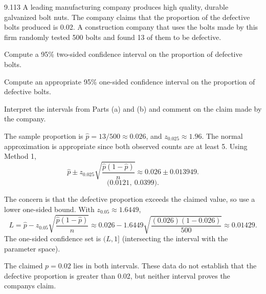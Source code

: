 \documentclass[11pt,oneside]{article}
\begin{document}
\begin{exercise}{9.113}
A leading manufacturing company produces high quality, durable galvanized bolt nuts. The company claims that the proportion of the defective bolts produced is 0.02. A construction company that uses the bolts made by this firm randomly tested 500 bolts and found 13 of them to be defective.
\begin{exercisesubparts}
\item Compute a 95\% two-sided confidence interval on the proportion of defective bolts.
\item Compute an appropriate 95\% one-sided confidence interval on the proportion of defective bolts.
\item Interpret the intervals from Parts (a) and (b) and comment on the claim made by the company.
\end{exercisesubparts}
\end{exercise}
\begin{solution}
\begin{exercisesubparts}
\item The sample proportion is $\hat p=13/500\approx0.026$, and $z_{0.025}\approx1.96$. The normal approximation is appropriate since both observed counts are at least 5. Using Method 1,
\[
\hat p\pm z_{0.025}\sqrt{\frac{\hat p(1-\hat p)}{n}}\approx0.026\pm 0.013949.
\]
\[
\boxed{\bigl(0.0121,\ 0.0399\bigr)}.
\]

\item The concern is that the defective proportion exceeds the claimed value, so use a lower one-sided bound. With $z_{0.05}\approx1.6449$,
\[
L=\hat p-z_{0.05}\sqrt{\frac{\hat p(1-\hat p)}{n}}\approx 0.026-1.6449\sqrt{\frac{(0.026)(1-0.026)}{500}}\approx\boxed{0.01429}.
\]
The one-sided confidence set is $(L,1]$ (intersecting the interval with the parameter space).
\item The claimed $p=0.02$ lies in both intervals. These data do not establish that the defective proportion is greater than 0.02, but neither interval proves the company\textquotesingle s claim.
\end{exercisesubparts}
\end{solution}
\end{document}
